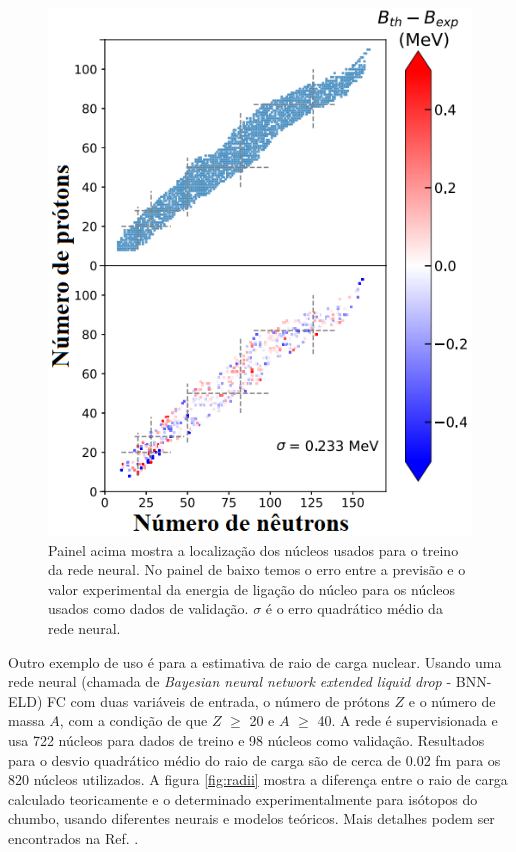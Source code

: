 \documentclass[a4paper,12pt,oneside]{book}
\begin{document}
\begin{appendices}
\begin{figure}[H]
    \centering
    \includegraphics[scale = 0.60]{figs/nuclei_mass.png}
    \caption{Painel acima mostra a localização dos núcleos usados para o treino da rede neural. No painel de baixo temos o erro entre a previsão e o valor experimental da energia de ligação do núcleo para os núcleos usados como dados de validação. $\sigma$ é o erro quadrático médio da rede neural.}
    \label{fig:nuclei_mass_ml}
\end{figure}

\par Outro exemplo de uso é para a estimativa de raio de carga nuclear. Usando uma rede neural (chamada de \textit{Bayesian neural network extended liquid drop} - BNN-ELD) FC com duas variáveis de entrada, o número de prótons $Z$ e o número de massa $A$, com a condição de que $Z$ $\geq$ 20 e $A$ $\geq$ 40. A rede é supervisionada e usa 722 núcleos para dados de treino e 98 núcleos como validação. Resultados para o desvio quadrático médio do raio de carga são de cerca de 0.02 fm para os 820 núcleos utilizados. A figura \ref{fig:radii} mostra a diferença entre o raio de carga calculado teoricamente e o determinado experimentalmente para isótopos do chumbo, usando diferentes neurais e modelos teóricos. Mais detalhes podem ser encontrados na Ref. \cite{raio_carga}.


\end{appendices}
\end{document}
